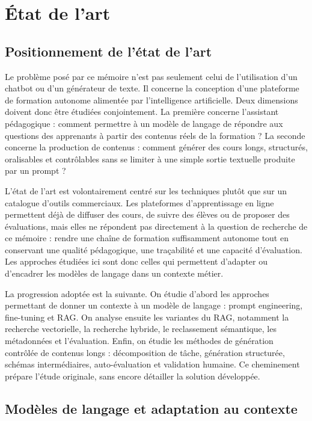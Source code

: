 \section{État de l'art}

\subsection{Positionnement de l'état de l'art}

Le problème posé par ce mémoire n'est pas seulement celui de l'utilisation d'un chatbot
ou d'un générateur de texte. Il concerne la conception d'une plateforme de formation
autonome alimentée par l'intelligence artificielle. Deux dimensions doivent donc être
étudiées conjointement. La première concerne l'assistant pédagogique : comment permettre
à un modèle de langage de répondre aux questions des apprenants à partir des contenus
réels de la formation ? La seconde concerne la production de contenus : comment générer
des cours longs, structurés, oralisables et contrôlables sans se limiter à une simple sortie
textuelle produite par un prompt ?

L'état de l'art est volontairement centré sur les techniques plutôt que sur un catalogue
d'outils commerciaux. Les plateformes d'apprentissage en ligne permettent déjà de
diffuser des cours, de suivre des élèves ou de proposer des évaluations, mais elles ne
répondent pas directement à la question de recherche de ce mémoire : rendre une chaîne
de formation suffisamment autonome tout en conservant une qualité pédagogique, une
traçabilité et une capacité d'évaluation. Les approches étudiées ici sont donc celles qui
permettent d'adapter ou d'encadrer les modèles de langage dans un contexte métier.

La progression adoptée est la suivante. On étudie d'abord les approches permettant de
donner un contexte à un modèle de langage : prompt engineering, fine-tuning et RAG. On
analyse ensuite les variantes du RAG, notamment la recherche vectorielle, la recherche
hybride, le reclassement sémantique, les métadonnées et l'évaluation. Enfin, on étudie
les méthodes de génération contrôlée de contenus longs : décomposition de tâche,
génération structurée, schémas intermédiaires, auto-évaluation et validation humaine. Ce
cheminement prépare l'étude originale, sans encore détailler la solution développée.

\subsection{Modèles de langage et adaptation au contexte}

